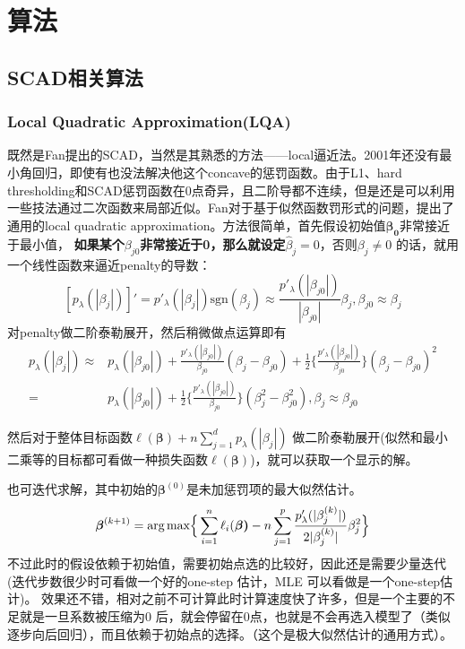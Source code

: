 ﻿\documentclass[hyperref,12pt]{ctexart}
\begin{document}
\section{算法}
\subsection{SCAD相关算法}
\subsubsection{Local Quadratic Approximation(LQA)}
既然是Fan提出的SCAD，当然是其熟悉的方法——local逼近法。2001年还没有最小角回归，即使有也没法解决他这个concave的惩罚函数。由于L1、hard thresholding和SCAD惩罚函数在0点奇异，且二阶导都不连续，但是还是可以利用一些技法通过二次函数来局部近似。Fan对于基于似然函数罚形式的问题，提出了通用的local quadratic approximation。方法很简单，首先假设初始值$\boldsymbol{\beta_0}$非常接近于最小值，
\textbf{如果某个$\beta_{j0}$非常接近于0，那么就设定$\hat{\beta}_j = 0$}，否则$\beta_j \neq 0$ 的话，就用一个线性函数来逼近penalty的导数：
\[
[p_{\lambda}(|\beta_j|)]' = p'_{\lambda}(|\beta_j|)\text{sgn}(\beta_j) \approx \frac{p'_{\lambda}(|\beta_{j0}|)}{|\beta_{j0}|}\beta_j, \beta_{j0} \approx \beta_j
\]
对penalty做二阶泰勒展开，然后稍微做点运算即有
\[
\begin{split}
p_{\lambda}(|\beta_j|) \approx & p_{\lambda}(|\beta_{j0}|) + \frac{p'_{\lambda}(|\beta_{j0}|)}{\beta_{j0}}(\beta_j - \beta_{j0}) +  \frac{1}{2}\{\frac{p'_{\lambda}(|\beta_{j0}|)}{\beta_{j0}}\}(\beta_j - \beta_{j0})^2 \\
= & p_{\lambda}(|\beta_{j0}|) + \frac{1}{2}\{\frac{p'_{\lambda}(|\beta_{j0}|)}{\beta_{j0}}\}(\beta_j^2 - \beta_{j0}^2), \beta_j \approx \beta_{j0}
\end{split}
\]

然后对于整体目标函数$\ell(\boldsymbol{\beta})+ n \sum^d_{j = 1}p_{\lambda}(|\beta_j|)$ 做二阶泰勒展开(似然和最小二乘等的目标都可看做一种损失函数$\ell(\boldsymbol{\beta})$)，就可以获取一个显示的解。

也可迭代求解，其中初始的$\boldsymbol{\beta}^{(0)}$是未加惩罚项的最大似然估计。
\[
\boldsymbol{\beta}^{(k+1)} = \text{arg\,max}\Big\{\sum^n_{i = 1} \ell_i(\boldsymbol{\beta)} - n \sum^p_{j = 1}\frac{p'_{\lambda}(|\beta_j^{(k)}|)}{2|\beta_j^{(k)}|}\beta_j^2\Big\}
\]
不过此时的假设依赖于初始值，需要初始点选的比较好，因此还是需要少量迭代(迭代步数很少时可看做一个好的one-step 估计，MLE 可以看做是一个one-step估计)。 效果还不错，相对之前不可计算此时计算速度快了许多，但是一个主要的不足就是一旦系数被压缩为0 后，就会停留在0点，也就是不会再选入模型了（类似逐步向后回归），而且依赖于初始点的选择。（这个是极大似然估计的通用方式）。
\end{document}
